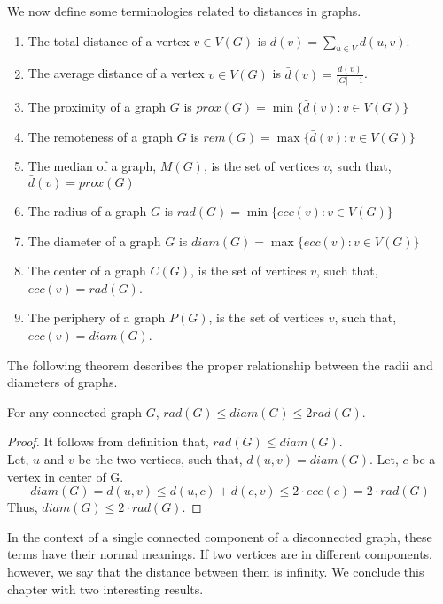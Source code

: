We now define some terminologies related to distances in graphs.
\begin{enumerate}
    \item The total distance of a vertex $v \in V(G)$ is $d(v)=\sum_{u \in V} d(u,v)$.
    \item The average distance of a vertex $v \in V(G)$ is $\bar{d}(v)=\frac{d(v)}{|G|-1}$.
    \item The proximity of a graph $G$ is $prox(G)=\min \{\bar{d}(v) : v \in V(G)\}$
    \item The remoteness of a graph $G$ is $rem(G)=\max \{\bar{d}(v) : v \in V(G)\}$ 
    \item The median of a graph, $M(G)$, is the set of vertices $v$, such that, $\bar{d}(v)=prox(G)$
    \item The radius of a graph $G$ is $rad(G)=\min \{ecc(v) : v \in V(G)\}$
    \item The diameter of a graph $G$ is $diam(G)=\max \{ecc(v) : v \in V(G)\}$
    \item The center of a graph $C(G)$, is the set of vertices $v$, such that, $ecc(v)=rad(G)$.
    \item The periphery of a graph $P(G)$, is the set of vertices $v$, such that, $ecc(v)=diam(G)$.
\end{enumerate}

The following theorem describes the proper relationship between the radii and
diameters of graphs.

\begin{thm}
    For any connected graph $G$, $rad(G) \le diam(G) \le 2rad(G)$.
\end{thm}
\begin{proof}
    It follows from definition that, $rad(G) \le diam(G)$.\\
    Let, $u$ and $v$ be the two vertices, such that, $d(u,v)=diam(G)$. Let, $c$ be a vertex in center of G.\\
    \begin{equation*}
        diam(G)=d(u,v) \le d(u,c)+d(c,v) \le 2\cdot ecc(c)=2\cdot rad(G)
    \end{equation*}
    Thus, $diam(G) \le 2\cdot rad(G)$.
\end{proof}

In the context of a single connected component of a disconnected graph, these terms have their normal meanings. If two vertices are in different components, however, we say that the distance between them is infinity. We conclude this chapter with two interesting results.

